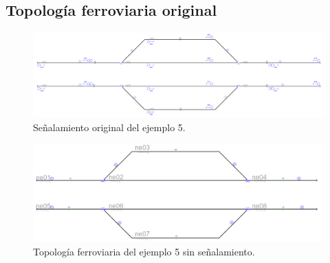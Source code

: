 \subsection{Topología ferroviaria original}

\lipsum[2]


\begin{figure}[H]
	\centering
	\includegraphics[width=1\textwidth]{resultados-obtenidos/ejemplo5/images/5_original.png}
	\centering\caption{Señalamiento original del ejemplo 5.}
\end{figure}

\lipsum[2]

\begin{figure}[H]
	\centering
	\includegraphics[width=1\textwidth]{resultados-obtenidos/ejemplo5/images/5_empty.png}
	\centering\caption{Topología ferroviaria del ejemplo 5 sin señalamiento.}
\end{figure}

\lipsum[2]
